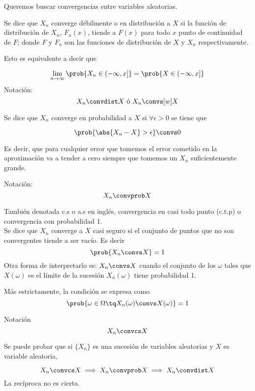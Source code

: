 \documentclass{apuntes}
\begin{document}
Queremos buscar convergencias entre variables aleatorias.

\begin{defn}

Se dice que $X_n$ converge débilmente o en distribución a $X$ si la función de distribución de $X_n$, $F_n(x)$, tiende a $F(x)$ para todo $x$ punto de continuidad de $F$; donde $F$ y $F_n$ son las funciones de distribución de $X$ y $X_n$ respectivamente.

Esto es equivalente a decir que

\[\lim_{n\to\infty} \prob{X_n\in (-\infty, x]} = \prob{X\in (-\infty, x]} \]
Notación:
\[ X_n  \convdist X \text{ ó }  X_n \convs[w] X \]
\end{defn}

\newpage
\begin{defn}
Se dice que $X_n$ converge en probabilidad a $X$ si $\forall \epsilon > 0$ se tiene que

\[\prob{\abs{X_n-X} > \epsilon} \convs 0 \]

Es decir, que para cualquier error que tomemos el error cometido en la aproximación va a tender a cero siempre que tomemos un $X_n$ suficientemente grande.

Notación: \[ X_n \convprob X \]
\end{defn}

\begin{defn} También denotada c.s o a.s en inglés, convergencia en casi todo punto (c.t.p) o convergencia con probabilidad 1.\\
Se dice que $X_n$ converge a $X$ casi seguro si el conjunto de puntos que no son convergentes tiende a ser vacío. Es decir
\[ \prob{X_n \convs X} = 1\]
Otra forma de interpretarlo es: $X_n \convs X$ cuando el conjunto de los $\omega$ tales que $X(\omega)$ es el límite de la sucesión $X_n(\omega)$ tiene probabilidad 1.

Más estrictamente, la condición se expresa como \[\prob{\omega \in \Omega\tq X_n(\omega) \convs X(\omega)} = 1\]

Notación \[ X_n\convcs X \]
\end{defn}


\begin{theorem}Se puede probar que si $\{X_n\}$ es una sucesión de variables aleatorias y $X$ es variable aleatoria,

\[ X_n\convcs X \implies X_n \convprob X \implies X_n \convdist X \]
La recíproca no es cierta.
\end{theorem}
\end{document}

